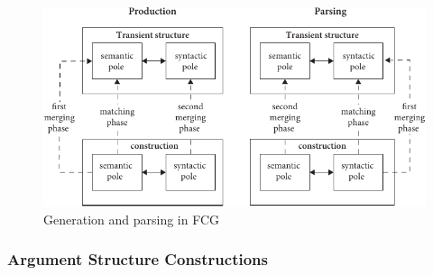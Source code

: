 \begin{figure}
\includegraphics[width=.98\textwidth]{Figures/production-parsing-fcg.pdf}
\caption{\label{fig-matching-merging-trijp}Generation and parsing in FCG \citep[]{vanTrijp2013a}}
\end{figure}%

\subsubsection{Argument Structure Constructions}


